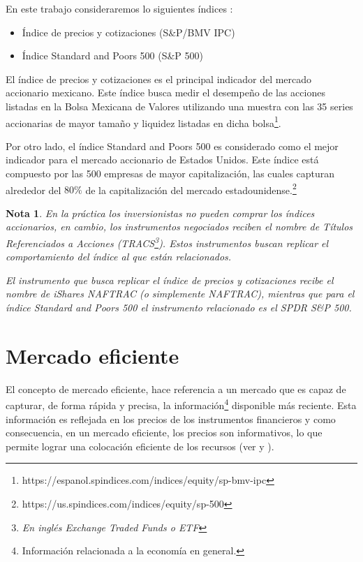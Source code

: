 \documentclass[12pt]{report}
\theoremstyle{break}
\newtheorem{nota}{Nota}[chapter]
\theoremstyle{break}
\begin{document}
En este trabajo consideraremos lo siguientes índices :

\begin{itemize}
\item Índice de precios y cotizaciones (S\&P/BMV IPC)
\item Índice Standard and Poors 500 (S\&P 500)
\end{itemize}

El índice de precios y cotizaciones es el principal indicador del mercado accionario mexicano. Este índice busca medir el desempeño de las acciones listadas en la Bolsa Mexicana de Valores utilizando una muestra con las 35 series accionarias de mayor tamaño y liquidez listadas en dicha bolsa\footnote{https://espanol.spindices.com/indices/equity/sp-bmv-ipc}.

Por otro lado, el índice Standard and Poors 500 es considerado como el mejor indicador para el mercado accionario de Estados Unidos. Este índice está compuesto por las 500 empresas de mayor capitalización, las cuales capturan alrededor del $80\%$ de la capitalización del mercado estadounidense.\footnote{https://us.spindices.com/indices/equity/sp-500}

\begin{nota} \label{nota:ETF}
En la práctica los inversionistas no pueden comprar los índices accionarios, en cambio, los instrumentos negociados reciben el nombre de Títulos Referenciados a Acciones (TRACS\footnote{En inglés Exchange Traded Funds o ETF}). Estos instrumentos buscan replicar el comportamiento del índice al que están relacionados.

El instrumento que busca replicar el índice de precios y cotizaciones recibe el nombre de iShares NAFTRAC (o simplemente NAFTRAC), mientras que para el índice Standard and Poors 500 el instrumento relacionado es el SPDR S\&P 500.
\end{nota}

\section{Mercado eficiente}
\label{seccion:mercado eficiente}
El concepto de mercado eficiente, hace referencia a un mercado que es capaz de capturar, de forma rápida y precisa, la información\footnote{Información relacionada a la economía en general.} disponible más reciente. Esta información es reflejada en los precios de los instrumentos financieros y como consecuencia, en un mercado eficiente, los precios son informativos, lo que permite lograr una colocación eficiente de los recursos (ver \cite{Fama1965} y \cite{CFA2019}).
\end{document}
